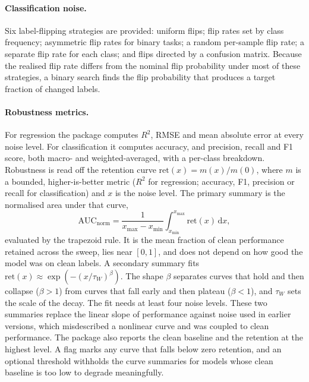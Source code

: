 \paragraph{Classification noise.} Six label-flipping strategies are provided: uniform flips; flip
rates set by class frequency; asymmetric flip rates for binary tasks; a random per-sample flip rate;
a separate flip rate for each class; and flips directed by a confusion matrix. Because the realised
flip rate differs from the nominal flip probability under most of these strategies, a binary search
finds the flip probability that produces a target fraction of changed labels.

\paragraph{Robustness metrics.} For regression the package computes $R^2$, RMSE and mean absolute
error at every noise level. For classification it computes accuracy, and precision, recall and F1
score, both macro- and weighted-averaged, with a per-class breakdown. Robustness is read off the
retention curve $\mathrm{ret}(x) = m(x)/m(0)$, where $m$ is a bounded, higher-is-better metric
($R^2$ for regression; accuracy, F1, precision or recall for classification) and $x$ is the noise
level. The primary summary is the normalised area under that curve,
\begin{equation}
\mathrm{AUC}_{\mathrm{norm}} = \frac{1}{x_{\max} - x_{\min}} \int_{x_{\min}}^{x_{\max}} \mathrm{ret}(x)\,\mathrm{d}x,
\label{eq:auc_norm}
\end{equation}
evaluated by the trapezoid rule. It is the mean fraction of clean performance retained across the
sweep, lies near $[0, 1]$, and does not depend on how good the model was on clean labels. A
secondary summary fits $\mathrm{ret}(x) \approx \exp\!\left(-(x/\tau_W)^{\beta}\right)$. The shape
$\beta$ separates curves that hold and then collapse ($\beta > 1$) from curves that fall early and
then plateau ($\beta < 1$), and $\tau_W$ sets the scale of the decay. The fit needs at least four
noise levels. These two summaries replace the linear slope of performance against noise used in
earlier versions, which misdescribed a nonlinear curve and was coupled to clean performance. The
package also reports the clean baseline and the retention at the highest level. A flag marks any
curve that falls below zero retention, and an optional threshold withholds the curve summaries for
models whose clean baseline is too low to degrade meaningfully.

